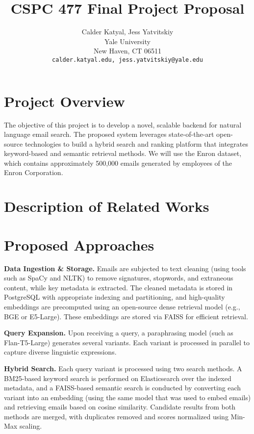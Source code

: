 \documentclass{article}
\title{CSPC 477 Final Project Proposal}
\author{%
  Calder Katyal, Jess Yatvitskiy\\
  Yale University\\
  New Haven, CT 06511 \\
  \texttt{calder.katyal.edu, jess.yatvitskiy@yale.edu} \\
}
\begin{document}
\maketitle
\vspace{-2em}
\section{Project Overview}
\label{project_overview}

The objective of this project is to develop a novel, scalable backend for natural language email search. The proposed system leverages state-of-the-art open-source technologies to build a hybrid search and ranking platform that integrates keyword-based and semantic retrieval methods. We will use the Enron dataset, which contains approximately 500,000 emails generated by employees of the Enron Corporation.
\section{Description of Related Works}
\label{related_works}

\section{Proposed Approaches}

\textbf{Data Ingestion \& Storage.} Emails are subjected to text cleaning (using tools such as SpaCy and NLTK) to remove signatures, stopwords, and extraneous content, while key metadata is extracted. The cleaned metadata is stored in PostgreSQL with appropriate indexing and partitioning, and high-quality embeddings are precomputed using an open-source dense retrieval model (e.g., BGE or E5-Large). These embeddings are stored via FAISS for efficient retrieval.

\textbf{Query Expansion.} Upon receiving a query, a paraphrasing model (such as Flan-T5-Large) generates several variants. Each variant is processed in parallel to capture diverse linguistic expressions.

\textbf{Hybrid Search.} Each query variant is processed using two search methods. A BM25-based keyword search is performed on Elasticsearch over the indexed metadata, and a FAISS-based semantic search is conducted by converting each variant into an embedding (using the same model that was used to embed emails) and retrieving emails based on cosine similarity. Candidate results from both methods are merged, with duplicates removed and scores normalized using Min-Max scaling.
\end{document}
